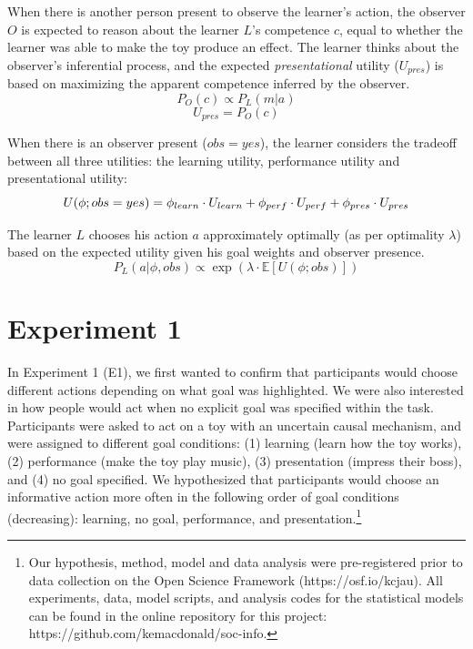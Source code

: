 \documentclass[10pt, letterpaper]{article}
\begin{document}
When there is another person present to observe the learner's action,
the observer \(O\) is expected to reason about the learner \(L\)'s
competence \(c\), equal to whether the learner was able to make the toy
produce an effect. The learner thinks about the observer's inferential
process, and the expected \emph{presentational} utility (\(U_{pres}\))
is based on maximizing the apparent competence inferred by the observer.
\[ P_O(c) \propto P_L(m | a)\] \[ U_{pres} = P_O(c)\] \noindent

When there is an observer present (\(obs = yes\)), the learner considers
the tradeoff between all three utilities: the learning utility,
performance utility and presentational utility:
\[ U(\phi; obs = yes) = \phi_{learn} \cdot U_{learn} + \\ \phi_{perf} \cdot U_{perf} + \phi_{pres} \cdot U_{pres}\]
\noindent

The learner \(L\) chooses his action \(a\) approximately optimally (as
per optimality \(\lambda\)) based on the expected utility given his goal
weights and observer presence.
\[ P_L(a | \phi, obs) \propto \exp(\lambda \cdot \mathbb{E}[U(\phi; obs)])\]
\noindent

\section{Experiment 1}\label{experiment-1}

In Experiment 1 (E1), we first wanted to confirm that participants would
choose different actions depending on what goal was highlighted. We were
also interested in how people would act when no explicit goal was
specified within the task. Participants were asked to act on a toy with
an uncertain causal mechanism, and were assigned to different goal
conditions: (1) learning (learn how the toy works), (2) performance
(make the toy play music), (3) presentation (impress their boss), and
(4) no goal specified. We hypothesized that participants would choose an
informative action more often in the following order of goal conditions
(decreasing): learning, no goal, performance, and
presentation.\footnote{Our hypothesis, method, model and data analysis were pre-registered prior to data collection on the Open Science Framework (https://osf.io/kcjau). All experiments, data, model scripts, and analysis codes for the statistical models can be found in the online repository for this project: https://github.com/kemacdonald/soc-info.}
\end{document}
